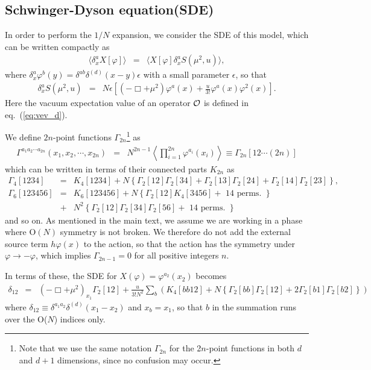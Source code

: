 \documentclass[preprint]{ptephy_v1}%
\begin{document}
\subsection{Schwinger-Dyson equation(SDE)}
In order to perform the $1/N$ expansion, we consider the   SDE of this model, which can be written compactly as
\begin{eqnarray}
\langle \delta^a_x X[\varphi] \rangle &=& \langle  X[\varphi] \delta^a_x S(\mu^2,u) \rangle,
\end{eqnarray}
where $ \delta^a_x \varphi^b(y) = \delta^{ab}\delta^{(d)}(x-y) \epsilon$
with a small parameter $\epsilon$, so that
\begin{eqnarray}
\delta^a_x S(\mu^2,u) &=& N \epsilon\left[ (- \Box +\mu^2)\varphi^a(x) + \frac{u}{3!}\varphi^a(x)\varphi^2(x)\right] .
\end{eqnarray}
Here  the vacuum expectation value of an operator ${\cal O}$  is defined in eq.~(\ref{eq:vev_d}).

We define $2n$-point  functions $\Gamma_{2n}$\footnote{Note that we use the same notation $\Gamma_{2n}$ for the 2$n$-point functions in both $d$ and $d+1$ dimensions, since no confusion may occur.}
as
\begin{eqnarray}
\Gamma^{a_1a_2\cdots a_{2n}}(x_1,x_2,\cdots,x_{2n}) &=&
N^{2n-1}\left\langle \prod_{i=1}^{2n} \varphi^{a_i}(x_i) \right\rangle \equiv 
\Gamma_{2n}[12\cdots (2n) ]
\label{eq:G2n_d}
\end{eqnarray}
which can be written in  terms of their connected parts $K_{2n}$ as
\begin{eqnarray}
\Gamma_4[1234] &=& K_4[1234] + N\left\{\Gamma_2[12]\Gamma_2[34] + \Gamma_2[13]\Gamma_2[24]
+\Gamma_2[14]\Gamma_2[23]   \right\}, \\
\Gamma_6[123456] &=& K_6[123456] + N\left\{\Gamma_2[12]K_4[3456] + \mbox{ 14 perms. } \right\}\nonumber \\
&+& N^2\left\{\Gamma_2[12] \Gamma_2[34]\Gamma_2[56]+ \mbox{ 14 perms. } \right\}
\end{eqnarray}
and so on. 
As mentioned in the main text, 
we assume we are working in a phase where O$(N)$ symmetry is not broken.
We therefore do not add the external source term $h \varphi(x)$ to the action, 
so that the action has the symmetry under $\varphi \rightarrow -\varphi$, which implies
$\Gamma_{2n-1} = 0$ for all positive integers $n$. 

In terms of these, the SDE for $X(\varphi) = \varphi^{a_2}(x_2)$ becomes
\begin{eqnarray}
\delta_{12} &=&  (- \Box +\mu^2)_{x_1} \Gamma_2[12] +\frac{u}{3! N^2}\sum_b \left(K_4[bb12]
+N\left\{ \Gamma_2[bb]\Gamma_2[12] + 2\Gamma_2[b1]\Gamma_2[b2]\right\} \right)~~~
\label{eq:SDE_2pt}
\end{eqnarray}
where $\delta_{12}\equiv\delta^{a_1a_2}\delta^{(d)}(x_1-x_2)$ and $x_b=x_1$, so that $b$ in the summation runs over the O($N$) indices only.
\end{document}
